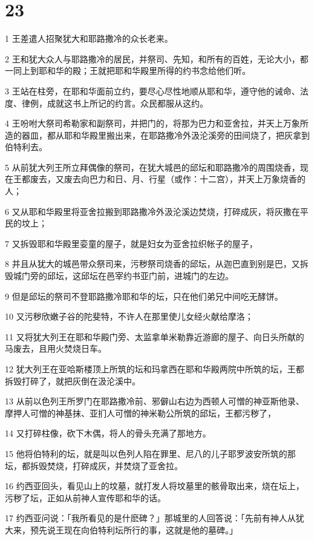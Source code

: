 \chapter{23}

\par 1 王差遣人招聚犹大和耶路撒冷的众长老来。
\par 2 王和犹大众人与耶路撒冷的居民，并祭司、先知，和所有的百姓，无论大小，都一同上到耶和华的殿；王就把耶和华殿里所得的约书念给他们听。
\par 3 王站在柱旁，在耶和华面前立约，要尽心尽性地顺从耶和华，遵守他的诫命、法度、律例，成就这书上所记的约言。众民都服从这约。
\par 4 王吩咐大祭司希勒家和副祭司，并把门的，将那为巴力和亚舍拉，并天上万象所造的器皿，都从耶和华殿里搬出来，在耶路撒冷外汲沦溪旁的田间烧了，把灰拿到伯特利去。
\par 5 从前犹大列王所立拜偶像的祭司，在犹大城邑的邱坛和耶路撒冷的周围烧香，现在王都废去，又废去向巴力和日、月、行星（或作：十二宫），并天上万象烧香的人；
\par 6 又从耶和华殿里将亚舍拉搬到耶路撒冷外汲沦溪边焚烧，打碎成灰，将灰撒在平民的坟上；
\par 7 又拆毁耶和华殿里娈童的屋子，就是妇女为亚舍拉织帐子的屋子，
\par 8 并且从犹大的城邑带众祭司来，污秽祭司烧香的邱坛，从迦巴直到别是巴，又拆毁城门旁的邱坛，这邱坛在邑宰约书亚门前，进城门的左边。
\par 9 但是邱坛的祭司不登耶路撒冷耶和华的坛，只在他们弟兄中间吃无酵饼。
\par 10 又污秽欣嫩子谷的陀斐特，不许人在那里使儿女经火献给摩洛；
\par 11 又将犹大列王在耶和华殿门旁、太监拿单米勒靠近游廊的屋子、向日头所献的马废去，且用火焚烧日车。
\par 12 犹大列王在亚哈斯楼顶上所筑的坛和玛拿西在耶和华殿两院中所筑的坛，王都拆毁打碎了，就把灰倒在汲沦溪中。
\par 13 从前以色列王所罗门在耶路撒冷前、邪僻山右边为西顿人可憎的神亚斯他录、摩押人可憎的神基抹、亚扪人可憎的神米勒公所筑的邱坛，王都污秽了，
\par 14 又打碎柱像，砍下木偶，将人的骨头充满了那地方。
\par 15 他将伯特利的坛，就是叫以色列人陷在罪里、尼八的儿子耶罗波安所筑的那坛，都拆毁焚烧，打碎成灰，并焚烧了亚舍拉。
\par 16 约西亚回头，看见山上的坟墓，就打发人将坟墓里的骸骨取出来，烧在坛上，污秽了坛，正如从前神人宣传耶和华的话。
\par 17 约西亚问说：「我所看见的是什麽碑？」那城里的人回答说：「先前有神人从犹大来，预先说王现在向伯特利坛所行的事，这就是他的墓碑。」
